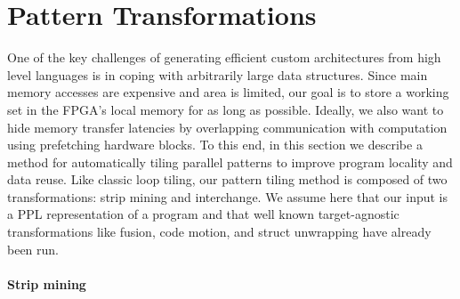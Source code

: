 \section{Pattern Transformations}
\label{transformations}

One of the key challenges of generating efficient custom architectures from high level languages is in coping with arbitrarily large data structures. Since main memory accesses
are expensive and area is limited, our goal is to store a working set in the FPGA's local memory for as long as possible. Ideally, we also want
to hide memory transfer latencies by overlapping communication with computation using prefetching hardware blocks.
To this end, in this section we describe a method for automatically tiling parallel patterns to improve program locality and data reuse.
Like classic loop tiling, our pattern tiling method is composed of two transformations: strip mining and interchange.
We assume here that our input is a PPL representation of a program and that well known target-agnostic transformations like fusion, code motion, and struct unwrapping have already been run.

\paragraph{Strip mining} %

